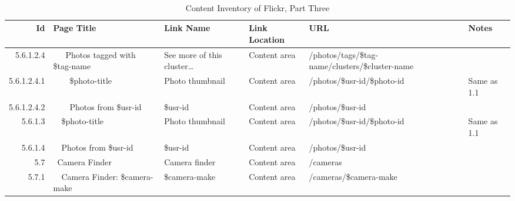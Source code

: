 \documentclass[12pt,a4paper]{article}
\begin{document}
\begin{landscape}
  \begin{table}[h!b!p!]
    \caption{Content Inventory of Flickr, Part Three}
    \label{table:content.inventory.flickr.3}
    \begin{center}
      \begin{tiny}
        \tt
        \begin{tabular}{r|l|l|l|l|p{3cm}}
            Id &
            Page Title &
            Link Name &
            Link Location &
            URL &
            Notes \\

            \hline

                    5.6.1.2.4 &
                    ~~~Photos tagged with \$tag-name &
                    See more of this cluster\ldots &
                    Content area &
                    /photos/tags/\$tag-name/clusters/\$cluster-name &
                    \\

                      5.6.1.2.4.1 &
                      ~~~~\$photo-title &
                      Photo thumbnail &
                      Content area &
                      /photos/\$usr-id/\$photo-id &
                      Same as 1.1 \\

                      5.6.1.2.4.2 &
                      ~~~~Photos from \$usr-id &
                      \$usr-id &
                      Content area &
                      /photos/\$usr-id &
                      \\

                  5.6.1.3 &
                  ~~\$photo-title &
                  Photo thumbnail &
                  Content area &
                  /photos/\$usr-id/\$photo-id &
                  Same as 1.1 \\

                  5.6.1.4 &
                  ~~Photos from \$usr-id &
                  \$usr-id &
                  Content area &
                  /photos/\$usr-id &
                  \\

              5.7 &
              ~Camera Finder &
              Camera finder &
              Content area &
              /cameras &
              \\

                5.7.1 &
                ~~Camera Finder: \$camera-make &
                \$camera-make &
                Content area &
                /cameras/\$camera-make &
                \\


\end{tabular}
\end{tiny}
\end{center}
\end{table}
\end{landscape}
\end{document}
